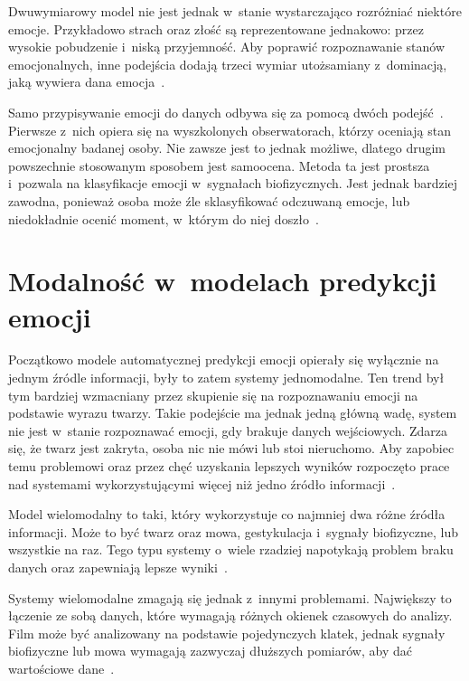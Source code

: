 Dwuwymiarowy model nie jest jednak w~stanie wystarczająco rozróżniać niektóre emocje.
Przykładowo strach oraz złość są reprezentowane jednakowo: przez wysokie pobudzenie i~niską przyjemność.
Aby poprawić rozpoznawanie stanów emocjonalnych, inne podejścia dodają trzeci wymiar utożsamiany z~dominacją, jaką wywiera dana emocja~\cite{Calvo2015}.

Samo przypisywanie emocji do danych odbywa się za pomocą dwóch podejść~\cite{Calvo2015}.
Pierwsze z~nich opiera się na wyszkolonych obserwatorach, którzy oceniają stan emocjonalny badanej osoby.
Nie zawsze jest to jednak możliwe, dlatego drugim powszechnie stosowanym sposobem jest samoocena.
Metoda ta jest prostsza i~pozwala na klasyfikacje emocji w~sygnałach biofizycznych.
Jest jednak bardziej zawodna, ponieważ osoba może źle sklasyfikować odczuwaną emocje, lub niedokładnie ocenić moment, w~którym do niej doszło~\cite{Calvo2015}.

\section{Modalność w~modelach predykcji emocji}\label{sec:modalnosc-w-modelach-predykcji-emocji}

Początkowo modele automatycznej predykcji emocji opierały się wyłącznie na jednym źródle informacji, były to zatem systemy jednomodalne.
Ten trend był tym bardziej wzmacniany przez skupienie się na rozpoznawaniu emocji na podstawie wyrazu twarzy.
Takie podejście ma jednak jedną główną wadę, system nie jest w~stanie rozpoznawać emocji, gdy brakuje danych wejściowych.
Zdarza się, że twarz jest zakryta, osoba nic nie mówi lub stoi nieruchomo.
Aby zapobiec temu problemowi oraz przez chęć uzyskania lepszych wyników rozpoczęto prace nad systemami wykorzystującymi więcej niż jedno źródło informacji~\cite{Calvo2015}.

Model wielomodalny to taki, który wykorzystuje co najmniej dwa różne źródła informacji.
Może to być twarz oraz mowa, gestykulacja i~sygnały biofizyczne, lub wszystkie na raz.
Tego typu systemy o~wiele rzadziej napotykają problem braku danych oraz zapewniają lepsze wyniki~\cite{DMello2012}.

Systemy wielomodalne zmagają się jednak z~innymi problemami.
Największy to łączenie ze sobą danych, które wymagają różnych okienek czasowych do analizy.
Film może być analizowany na podstawie pojedynczych klatek, jednak sygnały biofizyczne lub mowa wymagają zazwyczaj dłuższych pomiarów, aby dać wartościowe dane~\cite{Calvo2015}.
